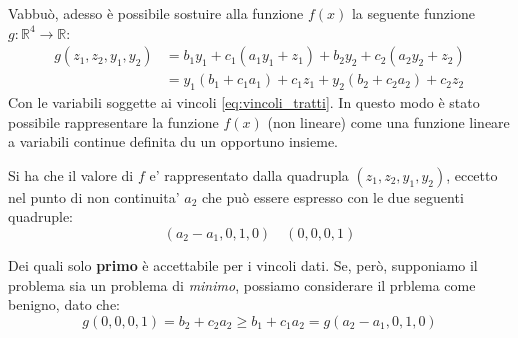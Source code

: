 Vabbuò, adesso è possibile sostuire alla funzione $f(x)$ la seguente funzione $g:\mathbb{R}^4\to \mathbb{R}$:
\[
  \begin{aligned}
    g(z_1, z_2, y_1,y_2 ) &= b_1y_1 + c_1(a_1y_1+z_1) + b_2y_2 + c_2(a_2y_2 + z_2) \\
    &= y_1(b_1+c_1a_1)+c_1z_1 + y_2(b_2+c_2a_2) + c_2z_2
  \end{aligned}
\]
Con le variabili soggette ai vincoli \ref{eq:vincoli_tratti}. In questo modo è stato possibile rappresentare la funzione $f(x)$ (non lineare) come una funzione lineare a variabili continue definita du un opportuno insieme.

Si ha che il valore di $ f $ e' rappresentato  dalla quadrupla $(z_1, z_2,y_1,y_2)$, eccetto nel punto di non continuita' $a_2$ che può essere espresso con le due seguenti quadruple:
\[
  (a_2 - a_1, 0, 1, 0) \quad (0, 0, 0, 1)
\] 

Dei quali solo \textbf{primo} è accettabile per i vincoli dati. Se, però, supponiamo il problema sia un problema di \textit{minimo}, possiamo considerare il prblema come benigno, dato che:
\[
  g(0,0,0,1) = b_2+c_2a_2 \geq b_1+c_1a_2 = g(a_2-a_1,0,1,0)
\]


